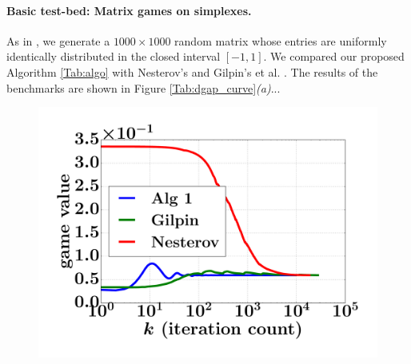 \documentclass{article} %
\begin{document}
\paragraph{Basic test-bed: Matrix games on simplexes.}
As in \cite{nesterov2005a,chambolle2014ergodic}, we generate a $1000
\times 1000$ random matrix whose entries are uniformly identically
distributed in the closed interval $[-1, 1]$. We compared our proposed
Algorithm \ref{Tab:algo} with Nesterov's \cite{nesterov2005a} and Gilpin's et
al. \cite{gilpinfirst}. The results of the benchmarks are shown in
Figure \ref{Tab:dgap_curve}\textit{(a)}...


\begin{figure}[!htpb]
  \hspace{-2em}
  \vspace{-1em}
  \hspace{-2em}
  \includegraphics[width=.5\linewidth]{1.pdf}

\end{figure}
\end{document}
